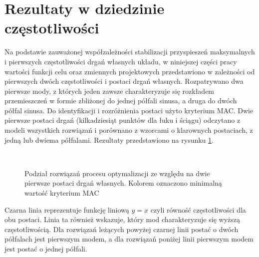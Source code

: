 \section{Rezultaty w dziedzinie częstotliwości}


Na podstawie zauważonej współzależności stabilizacji przyspieszeń maksymalnych i pierwszych częstotliwości drgań własnych układu, w niniejszej części pracy wartości funkcji celu oraz zmiennych projektowych przedstawiono w zależności od pierwszych dwóch częstotliwości i postaci drgań własnych. Rozpatrywano dwa pierwsze mody, z których jeden zawsze charakteryzuje się rozkładem przemieszczeń w formie zbliżonej do jednej półfali sinusa, a druga do dwóch półfal sinusa. Do identyfikacji i rozróżnienia postaci użyto kryterium MAC. Dwie pierwsze postaci drgań (kilkadziesiąt punktów dla łuku i ściągu) odczytano z modeli wszystkich rozwiązań i porównano z wzorcami o klarownych postaciach, z jedną lub dwiema półfalami. Rezultaty przedstawiono na rysunku \ref{fig:minimum_mac_values_shape_division}.

\begin{figure}[hbt!]
	\centering
	 \\
	
	\caption{Podział rozwiązań procesu optymalizacji ze względu na dwie pierwsze postaci drgań własnych. Kolorem oznaczono minimalną wartość kryterium MAC}
	\label{fig:minimum_mac_values_shape_division}
\end{figure}
 Czarna linia reprezentuje funkcję liniową $y=x$ czyli równość częstotliwości dla obu postaci. Linia ta również wskazuje, który mod charakteryzuje się wyższą częstotliwością. Dla rozwiązań leżących powyżej czarnej linii postać o dwóch półfalach jest pierwszym modem, a dla rozwiązań poniżej linii pierwszym modem jest postać o jednej półfali.

